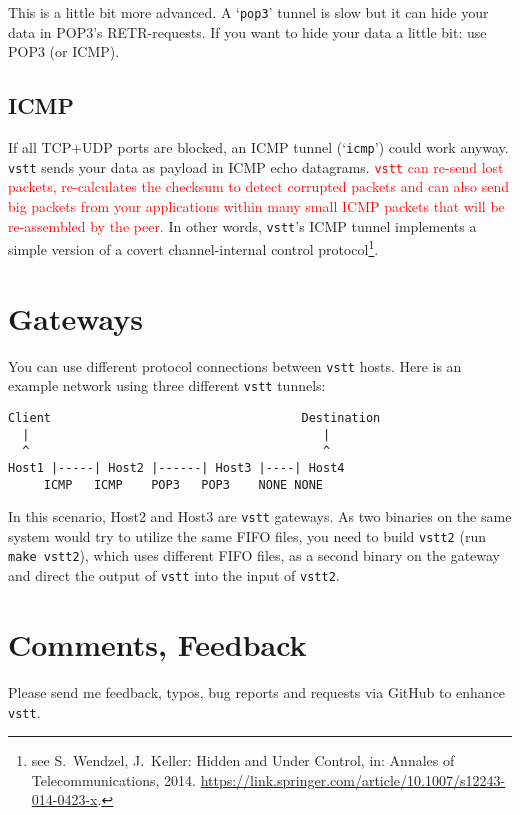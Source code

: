 \documentclass[10pt,a4paper]{article}
\begin{document}
This is a little bit more advanced. A `\texttt{pop3}' tunnel is slow but it can hide
your data in POP3's RETR-requests. If you want to hide your data a little bit:
use POP3 (or ICMP).

\subsection{ICMP}

If all TCP+UDP ports are blocked, an ICMP tunnel (`\texttt{icmp}') could work anyway. \texttt{vstt} sends
your data as payload in ICMP echo datagrams. \textcolor{red}{\texttt{vstt} can re-send lost packets,
re-calculates the checksum to detect corrupted packets and can
also send big packets from your applications within many small ICMP packets
that will be re-assembled by the peer.} In other words, \texttt{vstt}'s ICMP tunnel implements a simple version of a covert channel-internal control protocol\footnote{see S.~Wendzel, J.~Keller: Hidden and Under Control, in: Annales of Telecommunications, 2014. \url{https://link.springer.com/article/10.1007/s12243-014-0423-x}.}.


\section{Gateways}

You can use different protocol connections between \texttt{vstt}
hosts. Here is an example network using three different \texttt{vstt}
tunnels:

\begin{verbatim}
Client                                   Destination
  |                                         |
  ^                                         ^
Host1 |-----| Host2 |------| Host3 |----| Host4
     ICMP   ICMP    POP3   POP3    NONE NONE
\end{verbatim}

In this scenario, Host2 and Host3 are \texttt{vstt} gateways. As two binaries on the same system would try to utilize the same FIFO files, you need to build \texttt{vstt2} (run \texttt{make vstt2}), which uses different FIFO files, as a second binary on the gateway and direct the output of \texttt{vstt} into the input of \texttt{vstt2}.


\section{Comments, Feedback}

Please send me feedback, typos, bug reports and requests via GitHub
to enhance \texttt{vstt}.
\end{document}
